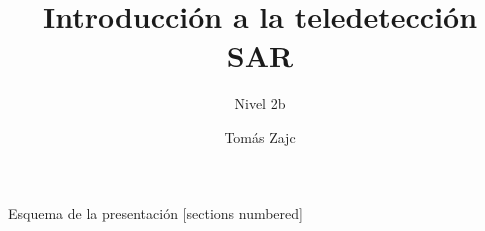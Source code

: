 \documentclass[handout,aspectratio=169]{beamer}
\title{Introducción a la teledetección SAR}
\subtitle{Nivel 2b}
\author{Tomás Zajc}
\institute{SAOCOM \\ Comisión Nacional de Actividades Espaciales}
\date{}
\begin{document}
\maketitle

\begin{frame}{Esquema de la presentación}
  [sections numbered]
  \tableofcontents[hideallsubsections]
\end{frame}



\end{document}
